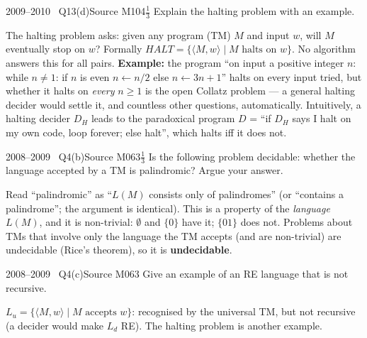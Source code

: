 \documentclass[11pt,a4paper]{article}
\begin{document}
\begin{question}{2009--2010 \textbullet\ Q13(d)}{Source M10}{4$\tfrac13$}
Explain the halting problem with an example.
\end{question}
\begin{solution}
The halting problem asks: given any program (TM) $M$ and input $w$, will $M$ eventually stop on $w$? Formally $\mathit{HALT}=\{\langle M,w\rangle\mid M\text{ halts on }w\}$. No algorithm answers this for all pairs. \textbf{Example:} the program ``on input a positive integer $n$: while $n\neq1$: if $n$ is even $n\leftarrow n/2$ else $n\leftarrow3n+1$'' halts on every input tried, but whether it halts on \emph{every} $n\ge1$ is the open Collatz problem --- a general halting decider would settle it, and countless other questions, automatically. Intuitively, a halting decider $D_H$ leads to the paradoxical program $D$ = ``if $D_H$ says I halt on my own code, loop forever; else halt'', which halts iff it does not.
\end{solution}

\begin{question}{2008--2009 \textbullet\ Q4(b)}{Source M06}{3$\tfrac13$}
Is the following problem decidable: whether the language accepted by a TM is palindromic? Argue your answer.
\end{question}
\begin{solution}
Read ``palindromic'' as ``$L(M)$ consists only of palindromes'' (or ``contains a palindrome''; the argument is identical). This is a property of the \emph{language} $L(M)$, and it is non-trivial: $\emptyset$ and $\{0\}$ have it; $\{01\}$ does not. Problems about TMs that involve only the language the TM accepts (and are non-trivial) are undecidable (Rice's theorem), so it is \textbf{undecidable}.
\end{solution}

\begin{question}{2008--2009 \textbullet\ Q4(c)}{Source M06}{3}
Give an example of an RE language that is not recursive.
\end{question}
\begin{solution}
$L_u=\{\langle M,w\rangle\mid M\text{ accepts }w\}$: recognised by the universal TM, but not recursive (a decider would make $L_d$ RE). The halting problem is another example.
\end{solution}
\end{document}
